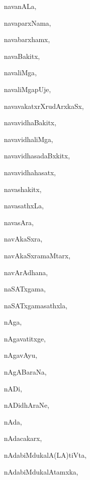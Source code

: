 \begin{multicols}{3}
{\noindent
{navanALa}, \pageref{navanALa}

\noindent
{navaparxNama}, \pageref{navaparxNama}

\noindent
{navabarxhamx}, \pageref{navabarxhamx}

\noindent
{navaBakitx}, \pageref{navaBakitx}

\noindent
{navaliMga}, \pageref{navaliMga}

\noindent
{navaliMgapUje}, \pageref{navaliMgapUje}

\noindent
{navavakatxrXrudArxkaSx}, \pageref{navavakatxrXrudArxkaSx}

\noindent
{navavidhaBakitx}, \pageref{navavidhaBakitx}

\noindent
{navavidhaliMga}, \pageref{navavidhaliMga}

\noindent
{navavidhasadaBxkitx}, \pageref{navavidhasadaBxkitx}

\noindent
{navavidhahasatx}, \pageref{navavidhahasatx}

\noindent
{navashakitx}, \pageref{navashakitx}

\noindent
{navasathxLa}, \pageref{navasathxLa}

\noindent
{navasAra}, \pageref{navasAra}

\noindent
{navAkaSxra}, \pageref{navAkaSxra}

\noindent
{navAkaSxramaMtarx}, \pageref{navAkaSxramaMtarx}

\noindent
{navArAdhana}, \pageref{navArAdhana}

\noindent
{naSATxgama}, \pageref{naSATxgama}

\noindent
{naSATxgamasathxla}, \pageref{naSATxgamasathxla}

\noindent
{nAga}, \pageref{nAga}

\noindent
{nAgavatitxge}, \pageref{nAgavatitxge}

\noindent
{nAgavAyu}, \pageref{nAgavAyu}

\noindent
{nAgABaraNa}, \pageref{nAgABaraNa}

\noindent
{nADi}, \pageref{nADi}

\noindent
{nADidhAraNe}, \pageref{nADidhAraNe}

\noindent
{nAda}, \pageref{nAda}

\noindent
{nAdacakarx}, \pageref{nAdacakarx}

\noindent
{nAdabiMdukalA(LA)tiVta}, \pageref{nAdabiMdukalALAtiVta}

\noindent
{nAdabiMdukalAtamxka}, \pageref{nAdabiMdukalAtamxka}

}
\end{multicols}
